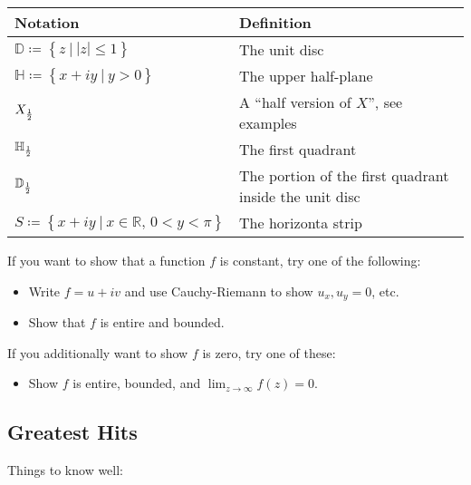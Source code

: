 \begin{longtable}[]{@{}
  >{\raggedright\arraybackslash}p{}
  >{\raggedright\arraybackslash}p{}@{}}
\toprule
Notation & Definition \\
\midrule
\endhead
\({\mathbb{D}}\coloneqq\left\{{z {~\mathrel{\Big|}~}{\left\lvert {z} \right\rvert} \leq 1}\right\}\)
& The unit disc \\
\({\mathbb{H}}\coloneqq\left\{{x+iy {~\mathrel{\Big|}~}y > 0}\right\}\)
& The upper half-plane \\
\(X_{1\over 2}\) & A ``half version of \(X\)'', see examples \\
\({\mathbb{H}}_{1\over 2}\) & The first quadrant \\
\({\mathbb{D}}_{1\over 2}\) & The portion of the first quadrant inside
the unit disc \\
\(S \coloneqq\left\{{x + iy {~\mathrel{\Big|}~}x\in {\mathbb{R}},\, 0<y<\pi}\right\}\)
& The horizonta strip \\
\bottomrule
\end{longtable}

\begin{remark}

If you want to show that a function \(f\) is constant, try one of the
following:

\begin{itemize}
\tightlist
\item
  Write \(f = u + iv\) and use Cauchy-Riemann to show \(u_x, u_y = 0\),
  etc.
\item
  Show that \(f\) is entire and bounded.
\end{itemize}

If you additionally want to show \(f\) is zero, try one of these:

\begin{itemize}
\tightlist
\item
  Show \(f\) is entire, bounded, and \(\lim_{z\to\infty} f(z) = 0\).
\end{itemize}

\end{remark}

\hypertarget{greatest-hits}{%
\subsection{Greatest Hits}\label{greatest-hits}}

Things to know well:

